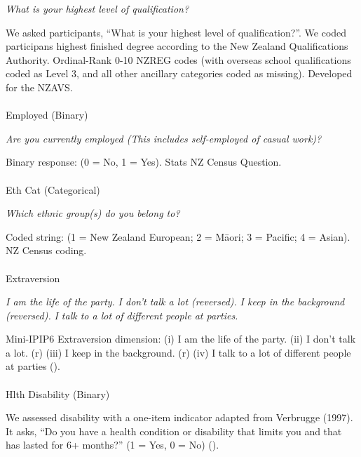 \documentclass[
  single column]{article}
\makeatletter
\let\oldparagraph\paragraph
\renewcommand{\paragraph}{
    \@ifstar
      \xxxParagraphStar
      \xxxParagraphNoStar
  }
\newcommand{\xxxParagraphStar}[1]{\oldparagraph*{#1}\mbox{}}
\newcommand{\xxxParagraphNoStar}[1]{\oldparagraph{#1}\mbox{}}
\makeatother
\begin{document}
\emph{What is your highest level of qualification?}

We asked participants, ``What is your highest level of qualification?''.
We coded participans highest finished degree according to the New
Zealand Qualifications Authority. Ordinal-Rank 0-10 NZREG codes (with
overseas school qualifications coded as Level 3, and all other ancillary
categories coded as missing). Developed for the NZAVS.

\paragraph{Employed (Binary)}\label{employed-binary}

\emph{Are you currently employed (This includes self-employed of casual
work)?}

Binary response: (0 = No, 1 = Yes). Stats NZ Census Question.

\paragraph{Eth Cat (Categorical)}\label{eth-cat-categorical}

\emph{Which ethnic group(s) do you belong to?}

Coded string: (1 = New Zealand European; 2 = Māori; 3 = Pacific; 4 =
Asian). NZ Census coding.

\paragraph{Extraversion}\label{extraversion}

\emph{I am the life of the party.} \emph{I don't talk a lot (reversed).}
\emph{I keep in the background (reversed).} \emph{I talk to a lot of
different people at parties.}

Mini-IPIP6 Extraversion dimension: (i) I am the life of the party. (ii)
I don't talk a lot. (r) (iii) I keep in the background. (r) (iv) I talk
to a lot of different people at parties
().

\paragraph{Hlth Disability (Binary)}\label{hlth-disability-binary}

We assessed disability with a one-item indicator adapted from Verbrugge
(1997). It asks, ``Do you have a health condition or disability that
limits you and that has lasted for 6+ months?'' (1 = Yes, 0 = No)
().
\end{document}
